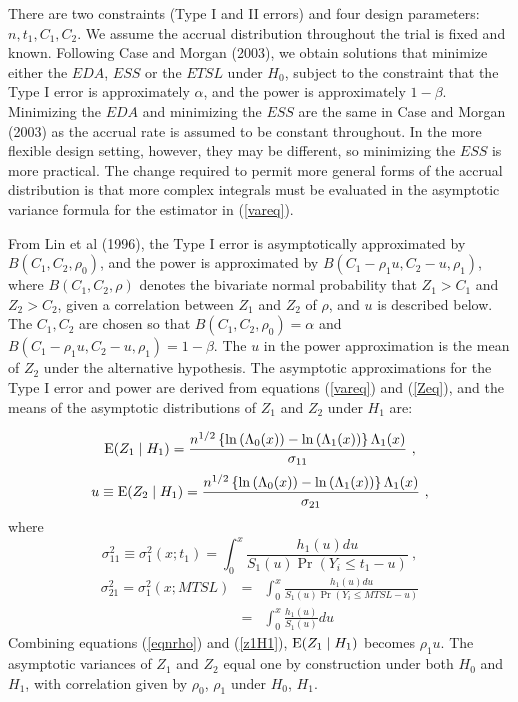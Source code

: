 \documentclass[12pt]{article}
\newcommand{\E}{\mbox{\rm E}}
\newcommand{\Eb}[1]{\E\!\left(#1\right)}
\begin{document}
There are two constraints (Type I and II errors) and four design parameters: $n, t_1, C_1, C_2$. We
assume the accrual distribution throughout the trial is fixed and known. Following Case and Morgan (2003), we obtain solutions that
minimize either the $EDA$, $ESS$ or the $ETSL$ under $H_0$, subject to the constraint that the Type
I error is approximately $\alpha$, and the power is approximately $1-\beta$. Minimizing the $EDA$
and minimizing the $ESS$ are the same in Case and Morgan (2003) as the accrual rate is assumed to
be constant throughout. In the more flexible design setting, however, they may be different, so
minimizing the $ESS$ is more practical. The change required to permit
more general forms of the accrual distribution is that more complex integrals must be evaluated in
the asymptotic variance formula for the estimator in (\ref{vareq}).

From Lin et al (1996), the Type I error is asymptotically approximated by $B(C_1,C_2,\rho_0)$, and
the power is approximated by $B(C_1-\rho_1 u,C_2-u,\rho_1)$, where $B(C_1,C_2,\rho)$ denotes the
bivariate normal probability that $Z_1>C_1$ and $Z_2>C_2$, given a correlation between $Z_1$ and
$Z_2$ of $\rho$, and $u$ is described below.  The $C_1, C_2$ are chosen so that $B(C_1,C_2,\rho_0)=\alpha$
and $B(C_1-\rho_1 u,C_2-u,\rho_1)=1-\beta$.  The $u$ in the power approximation is the mean of $Z_2$
under the alternative hypothesis.  The asymptotic approximations for the Type I error and power are
derived from equations (\ref{vareq}) and  (\ref{Zeq}), and the means of the asymptotic
distributions of $Z_1$ and $Z_2$ under $H_1$ are:

\begin{equation}
\Eb{Z_1\mid
H_1}=\frac{n^{1/2}\left\{\ln\left(\Lambda_0(x)\right)-\ln\left(\Lambda_1(x)\right)\right\}\Lambda_1(x)}{\sigma_{11}}
\ , \label{z1H1}
\end{equation}
\begin{equation}
u\equiv \Eb{Z_2\mid H_1}= \frac{n^{1/2}\left\{\ln\left(\Lambda_0(x)\right)-\ln\left(\Lambda_1(x)\right)\right\}\Lambda_1(x)}{\sigma_{21}} \ , \label{ueq}
\end{equation}
where
\begin{equation}
\sigma_{11}^2\equiv \sigma_{1}^2(x;t_1)=\int_0^{x} \frac{h_1(u)du}{S_1(u)\Pr(Y_i\leq t_1-u)} \ , \label{v11}
\end{equation}
\begin{eqnarray}
\sigma_{21}^2=\sigma_{1}^2(x;MTSL)&=&\int_0^{x} \frac{h_1(u)du}{S_1(u)\Pr(Y_i\leq MTSL-u)} \nonumber\\
 &=& \int_0^{x} \frac{h_1(u)}{S_1(u)}du \  \label{v21}
\end{eqnarray}
Combining equations (\ref{eqnrho}) and (\ref{z1H1}), $\Eb{Z_1\mid H_1}$  becomes $\rho_1 u$.  The
asymptotic variances of $Z_1$ and $Z_2$ equal one by construction under both $H_0$ and $H_1$, with
correlation given by $\rho_0$, $\rho_1$ under $H_0$, $H_1$.
\end{document}
